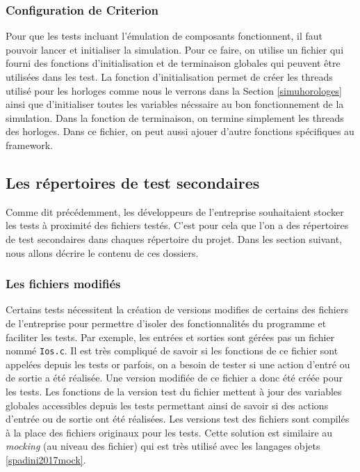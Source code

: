 \documentclass[a4paper]{article}
\begin{document}
\subsubsection*{Configuration de Criterion}
\label{configuration-de-criterion}

Pour que les tests incluant l'émulation de composants fonctionnent, il faut
pouvoir lancer et initialiser la simulation. Pour ce faire, on utilise un
fichier qui fourni des fonctions d'initialisation et de terminaison globales qui
peuvent être utilisées dans les test. La fonction d'initialisation permet de
créer les threads utilisé pour les horloges comme nous le verrons dans la
Section \ref{simuhorologes} ainsi que d'initialiser toutes les variables
nécssaire au bon fonctionnement de la simulation. Dans la fonction de
terminaison, on termine simplement les threads des horloges. Dans ce fichier, on
peut aussi ajouer d'autre fonctions spécifiques au framework.

\subsection{Les répertoires de test secondaires}

Comme dit précédemment, les développeurs de l'entreprise souhaitaient stocker
les tests à proximité des fichiers testés. C'est pour cela que l'on a des
répertoires de test secondaires dans chaques répertoire du projet. Dans les
section suivant, nous allons décrire le contenu de ces dossiers.

\subsubsection{Les fichiers modifiés}

Certains tests nécessitent la création de versions modifies de certains des
fichiers de l'entreprise pour permettre d'isoler des fonctionnalités du
programme et faciliter les tests. Par exemple, les entrées et sorties sont
gérées pas un fichier nommé \verb|Ios.c|. Il est très compliqué de savoir si les
fonctions de ce fichier sont appelées depuis les tests or parfois, on a besoin
de tester si une action d'entré ou de sortie a été réalisée. Une version modifiée
de ce fichier a donc été créée pour les tests. Les fonctions de la version test
du fichier mettent à jour des variables globales accessibles depuis les tests
permettant ainsi de savoir si des actions d'entrée ou de sortie ont été
réalisées. Les versions test des fichiers sont compilés à la place des fichiers
originaux pour les tests. Cette solution est similaire au \textit{mocking} (au
niveau des fichier) qui est très utilisé avec les langages objets
\ref{spadini2017mock}.
\end{document}
